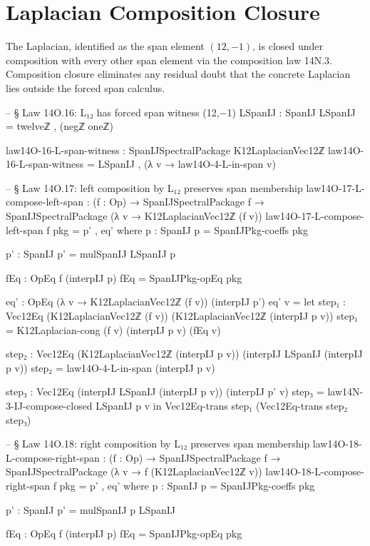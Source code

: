 \documentclass[11pt,a4paper]{book}
\begin{document}
\section{Laplacian Composition Closure}

The Laplacian, identified as the span element $(12,-1)$,
is closed under composition with every other span element
via the composition law 14N.3.  Composition closure eliminates any residual doubt
that the concrete Laplacian lies outside the forced span calculus.

\begin{code}
-- § Law 14O.16: L₁₂ has forced span witness (12,−1)
LSpanIJ : SpanIJ
LSpanIJ = twelveℤ , (negℤ oneℤ)

law14O-16-L-span-witness : SpanIJSpectralPackage K12LaplacianVec12ℤ
law14O-16-L-span-witness = LSpanIJ , (λ v → law14O-4-L-in-span v)

-- § Law 14O.17: left composition by L₁₂ preserves span membership
law14O-17-L-compose-left-span : (f : Op) → SpanIJSpectralPackage f → SpanIJSpectralPackage (λ v → K12LaplacianVec12ℤ (f v))
law14O-17-L-compose-left-span f pkg = p' , eq'
  where
    p : SpanIJ
    p = SpanIJPkg-coeffs pkg

    p' : SpanIJ
    p' = mulSpanIJ LSpanIJ p

    fEq : OpEq f (interpIJ p)
    fEq = SpanIJPkg-opEq pkg

    eq' : OpEq (λ v → K12LaplacianVec12ℤ (f v)) (interpIJ p')
    eq' v =
      let
        step₁ : Vec12Eq (K12LaplacianVec12ℤ (f v)) (K12LaplacianVec12ℤ (interpIJ p v))
        step₁ = K12Laplacian-cong (f v) (interpIJ p v) (fEq v)

        step₂ : Vec12Eq (K12LaplacianVec12ℤ (interpIJ p v)) (interpIJ LSpanIJ (interpIJ p v))
        step₂ = law14O-4-L-in-span (interpIJ p v)

        step₃ : Vec12Eq (interpIJ LSpanIJ (interpIJ p v)) (interpIJ p' v)
        step₃ = law14N-3-IJ-compose-closed LSpanIJ p v
      in
      Vec12Eq-trans step₁ (Vec12Eq-trans step₂ step₃)

-- § Law 14O.18: right composition by L₁₂ preserves span membership
law14O-18-L-compose-right-span : (f : Op) → SpanIJSpectralPackage f → SpanIJSpectralPackage (λ v → f (K12LaplacianVec12ℤ v))
law14O-18-L-compose-right-span f pkg = p' , eq'
  where
    p : SpanIJ
    p = SpanIJPkg-coeffs pkg

    p' : SpanIJ
    p' = mulSpanIJ p LSpanIJ

    fEq : OpEq f (interpIJ p)
    fEq = SpanIJPkg-opEq pkg


\end{code}
\end{document}
